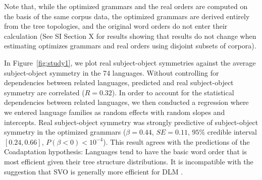 \documentclass[11pt,a4paper]{article}
\newcommand\comment[1]{{\color{red}#1}}
\begin{document}
Note that, while the optimized grammars and the real orders are computed on the basis of the same corpus data, the optimized grammars are derived entirely from the tree topologies, and the original word orders do not enter their calculation (See SI Section X for results showing that results do not change when estimating optimizes grammars and real orders using disjoint subsets of corpora).



In Figure~\ref{fig:study1}, we plot real subject-object symmetries against the average subject-object symmetry in the 74 languages.
Without controlling for dependencies between related languages, predicted and real subject-object symmetry are correlated ($R=0.32$).
In order to account for the statistical dependencies between related languages, we then conducted a regression where we entered language families as random effects with random slopes and intercepts.
Real subject-object symmetry was strongly predictive of subject-object symmetry in the optimized grammars ($\beta = 0.44$, $SE=0.11$, $95\%$ credible interval $[0.24, 0.66]$, $P(\beta<0) < 10^{-4}$).
This result agrees with the predictions of the Coadaptation hypothesis: Languages tend to have the basic word order that is most efficient given their tree structure distributions.
It is incompatible with the suggestion that SVO is generally more efficient for DLM \citep{ferrer-i-cancho-placement-2017}.




\end{document}
